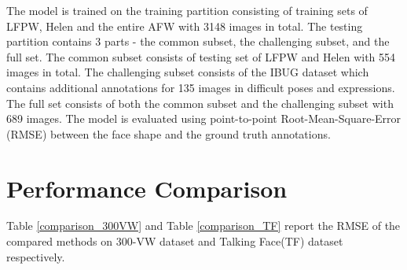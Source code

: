 \documentclass{llncs}
\begin{document}
The model is trained on the training partition consisting of training sets of LFPW, Helen and the entire AFW with 3148 images in total. The testing partition contains 3 parts - the common subset, the challenging subset, and the full set. The common subset consists of testing set of LFPW and Helen with 554 images in total. The challenging subset consists of the IBUG dataset which contains additional annotations for 135 images in difficult poses and expressions. The full set consists of both the common subset and the challenging subset with 689 images. The model is evaluated using point-to-point Root-Mean-Square-Error (RMSE) between the face shape and the ground truth annotations.


\section{Performance Comparison}


Table \textcolor{red}{\ref{comparison_300VW}} and Table \textcolor{red}{\ref{comparison_TF}} report the RMSE of the compared methods on 300-VW dataset and Talking Face(TF) dataset respectively.\\
 
\end{document}
